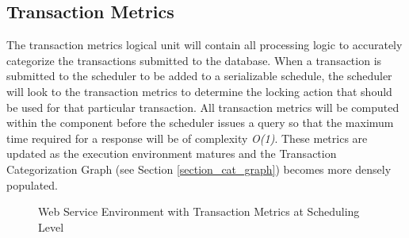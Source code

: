 \subsection{Transaction Metrics}
The transaction metrics logical unit will contain all processing logic to accurately categorize the transactions submitted to the database. When a transaction is submitted to the scheduler to be added to a serializable schedule, the scheduler will look to the transaction metrics to determine the locking action that should be used for that particular transaction. All transaction metrics will be computed within the component before the scheduler issues a query so that the maximum time required for a response will be of complexity \textit{O(1)}. These metrics are updated as the execution environment matures and the Transaction Categorization Graph (see Section \ref{section_cat_graph}) becomes more densely populated. 

\begin{figure}[ht]  
\captionsetup{justification=centering}
\centering %


\caption{Web Service Environment with Transaction Metrics at Scheduling Level} %
\label{fig:ws_env_with_metrics} %

\end{figure}